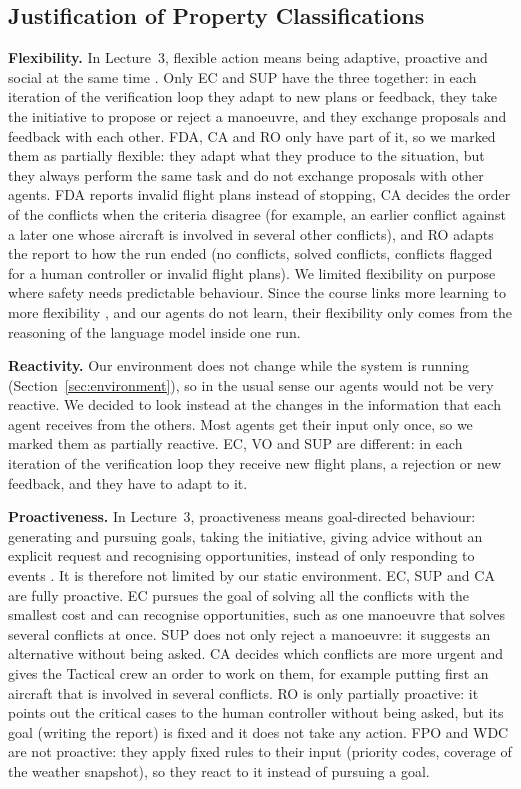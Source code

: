 \subsection{Justification of Property Classifications}
\label{sec:properties-justification}

\textbf{Flexibility.} In Lecture~3, flexible action means being adaptive, proactive and
social at the same time \cite{lecture3, wooldridge2009}. Only EC and SUP have the three
together: in each iteration of the verification loop they adapt to new plans or feedback,
they take the initiative to propose or reject a manoeuvre, and they exchange proposals and
feedback with each other. FDA, CA and RO only have part of it, so we marked them as
partially flexible: they adapt what they produce to the situation, but they always perform
the same task and do not exchange proposals with other agents. FDA reports invalid flight
plans instead of stopping, CA decides the order of the conflicts when the criteria disagree
(for example, an earlier conflict against a later one whose aircraft is involved in several
other conflicts), and RO adapts the report to how the run ended (no conflicts, solved
conflicts, conflicts flagged for a human controller or invalid flight plans). We limited
flexibility on purpose where safety needs predictable behaviour. Since the course
links more learning to more flexibility \cite{lecture3}, and our agents do not learn,
their flexibility only comes from the reasoning of the language model inside one run.

\textbf{Reactivity.} Our environment does not change while the system is running
(Section~\ref{sec:environment}), so in the usual sense \cite{lecture3} our agents would not
be very reactive.
We decided to look instead at the changes in the information that each agent receives
from the others. Most agents get their input only once, so we marked them as partially
reactive. EC, VO and SUP are different: in each iteration of the verification loop they
receive new flight plans, a rejection or new feedback, and they have to adapt to it.

\textbf{Proactiveness.} In Lecture~3, proactiveness means goal-directed behaviour: generating
and pursuing goals, taking the initiative, giving advice without an explicit request and
recognising opportunities, instead of only responding to events \cite{lecture3}. It is
therefore not limited by our static environment. EC, SUP and CA are fully proactive. EC
pursues the goal of solving all the conflicts with the smallest cost and can recognise
opportunities, such as one manoeuvre that solves several conflicts at once. SUP does not
only reject a manoeuvre: it suggests an alternative without being asked. CA decides which
conflicts are more urgent and gives the Tactical crew an order to work on them, for example
putting first an aircraft that is involved in several conflicts. RO is only partially
proactive: it points out the critical cases to the human controller without being asked,
but its goal (writing the report) is fixed and it does not take any action. FPO and WDC
are not proactive: they apply fixed rules to their input (priority codes, coverage of the
weather snapshot), so they react to it instead of pursuing a goal.


